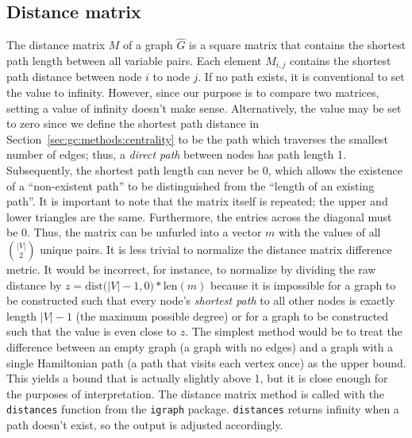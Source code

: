 \subsection{Distance matrix}

The distance matrix $M$ of a graph $\hat{G}$ is a square matrix that 
contains the shortest path length 
between all variable pairs. Each element $M_{i,j}$ 
contains the shortest path distance between node $i$ to node $j$. If no path 
exists, it is conventional to set the value to infinity. However, since our 
purpose is to compare two matrices, setting a value of infinity doesn't 
make sense. Alternatively, the value may be set to zero since we define the 
shortest path distance in Section~\ref{sec:gc:methods:centrality} to be 
the path which traverses the smallest number of edges; thus, a 
\textit{direct path} between nodes has path length 1. Subsequently, the 
shortest path length can never be 0, which allows the 
existence of a ``non-existent path'' to be distinguished from the ``length of 
an existing path''. It is important to note that the matrix itself is repeated; 
the upper and lower triangles are the same. Furthermore, the entries across the 
diagonal must be 0. Thus, the matrix can be unfurled into a vector 
$m$ with the values of all $\binom{|V|}{2}$ unique pairs.
It is less trivial to normalize the distance matrix difference metric. It would 
be incorrect, for instance, to normalize by dividing the raw distance 
by $z = \text{dist}\big(|V|-1,0\big) * \text{len}(m)$ because it is 
impossible for a graph to be constructed such that every node's 
\textit{shortest path} to all other nodes is exactly length $|V|-1$ (the 
maximum possible degree) or for a graph to be constructed such that the value 
is even close to $z$. 
The simplest method would be to treat the difference between an empty graph (a 
graph with no edges) and a graph with a single Hamiltonian path (a path that 
visits each vertex once) as the upper bound. This yields a bound that is 
actually slightly above 1, but it is close enough for the purposes of 
interpretation. 
The distance matrix method is called with the \texttt{distances} function from 
the \texttt{igraph} package. \texttt{distances} returns infinity when a path 
doesn't exist, so the output is adjusted accordingly.

